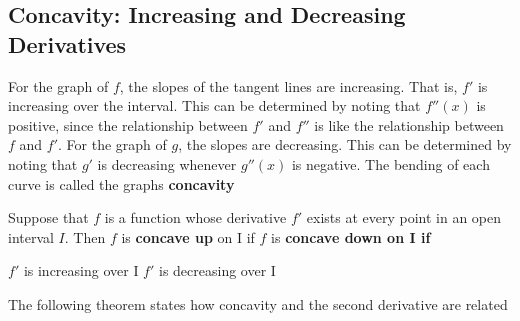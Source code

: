 \documentclass{report}
\begin{document}
\subsection*{Concavity: Increasing and Decreasing Derivatives}
For the graph of $f$, the slopes of the tangent lines are increasing. That is, $f'$ is increasing over the interval. This can be determined by noting that $f''(x)$ is positive, since the relationship between $f'$ and $f''$ is like the relationship between $f$ and $f'$.
\bigbreak \noindent
For the graph of $g$, the slopes are decreasing. This can be determined by noting that $g'$ is decreasing whenever $g''(x)$ is negative. The bending of each curve is called the graphs \textbf{concavity}
\bigbreak \noindent
\begin{mdframed}
 Suppose that $f$ is a function whose derivative $f'$ exists at every point in an open interval $I$. Then 
\bigbreak \noindent
\hspace{26mm}$f$ is \textbf{concave up} on I if \hspace{31mm} $f$ is \textbf{concave down on I if}

\hspace{16mm}$f'$ is increasing over I \hspace{35mm} $f'$ is decreasing over I
\bigbreak
\hspace{30mm}\begin{minipage}{0.5\textwidth}
\end{minipage}
\begin{minipage}{0.5\textwidth}
  \hspace{-20mm}
\end{minipage}
\end{mdframed}
\bigbreak \noindent
The following theorem states how concavity and the second derivative are related
\end{document}

